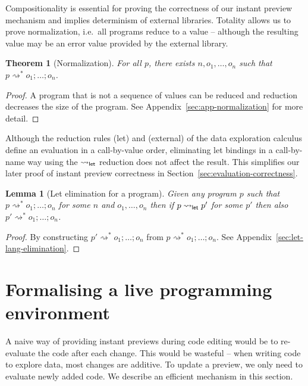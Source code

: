 \documentclass[english,crc]{programming}
\newcounter{thc}
\theoremstyle{plain}
\newtheorem{lem}[thc]{Lemma}
\newtheorem{theorem}[thc]{Theorem}
\theoremstyle{definition}
\newcommand{\ident}[1]{\textnormal{\textcolor{idclr}{\sffamily #1}}}
\newcommand{\rname}[1]{{\sffamily(#1)}}
\begin{document}
\noindent
Compositionality is essential for proving the correctness of our instant preview mechanism and
implies determinism of external libraries.
Totality allows us to prove normalization, i.e.~all programs reduce to
a value -- although the resulting value may be an error value provided by the external library.

\begin{theorem}[Normalization]
\label{thm:normalization}
For all $p$, there exists $n, o_1, \ldots, o_n$ such that $p\rightsquigarrow^{*} o_1;\ldots;o_n$.
\end{theorem}
\begin{proof}
A program that is not a sequence of values can be reduced and reduction decreases the size of the
program. See Appendix~\ref{sec:app-normalization} for more detail.
\end{proof}

\noindent
Although the reduction rules \rname{let} and \rname{external} of the data exploration calculus
define an evaluation in a call-by-value order, eliminating let bindings in a call-by-name way
using the $\rightsquigarrow_\ident{let}$ reduction does not affect the result. This
simplifies our later proof of instant preview correctness in Section~\ref{sec:evaluation-correctness}.

\begin{lem}[Let elimination for a program]
\label{thm:let-lang-elimination}
Given any program $p$ such that $p \rightsquigarrow^{*} o_1;\ldots;o_n$ for some $n$ and $o_1, \ldots, o_n$
then if $p \rightsquigarrow_\ident{let} p'$ for some $p'$ then also $p' \rightsquigarrow^{*} o_1;\ldots;o_n$.
\end{lem}
\begin{proof}
By constructing $p' \rightsquigarrow^{*} o_1;\ldots;o_n$ from
$p \rightsquigarrow^{*} o_1;\ldots;o_n$. See Appendix~\ref{sec:let-lang-elimination}.
\end{proof}


\section{Formalising a live programming environment}
\label{sec:formal}

A naive way of providing instant previews during code editing would be to re-evaluate the code
after each change. This would be wasteful -- when writing code to explore data, most changes are
additive. To update a preview, we only need to evaluate newly added code. We describe an
efficient mechanism in this section.
\end{document}
